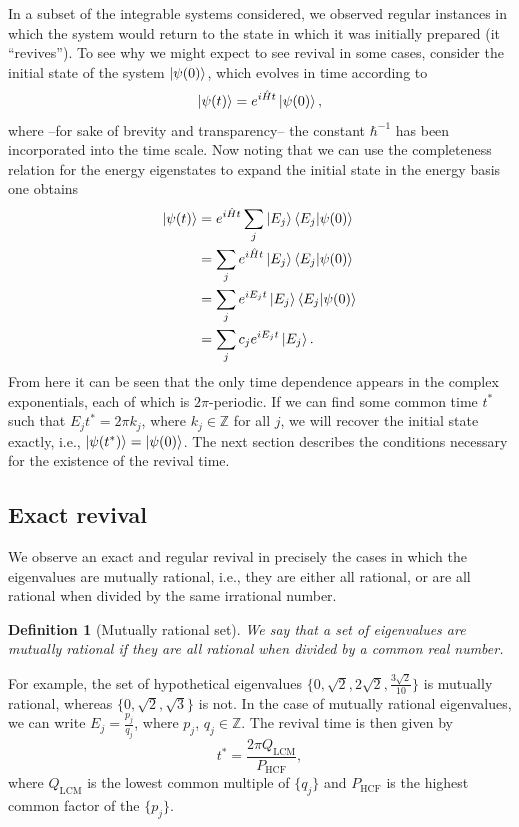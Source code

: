 \documentclass[prb, twocolumn, final]{revtex4-1}
\theoremstyle{plain}
\newtheorem{definition}[]{Definition}
\begin{document}
In a subset of the integrable systems considered, we observed regular instances
in which the system would return to the state in which it was initially
prepared (it ``revives''). To see why we might expect to see revival in
some cases, consider the initial state of the system $\ket{\psi(0)}$, which
evolves in time according to
\begin{equation}
    \ket{\psi(t)} = e^{i \hat{H} t} \ket{\psi(0)},
\end{equation}
where --for sake of brevity and transparency-- the constant $\hbar^{-1}$ has
been incorporated into the time scale. Now noting that we can use the
completeness relation for the energy eigenstates to expand the initial state in
the energy basis one obtains
\begin{align}
\label{time_evolution}
 \ket{\psi(t)} &= e^{i\hat{H}t}\sum_j\ket{E_j}\braket{E_j|\psi(0)}  \nonumber \\
               &= \sum_je^{i\hat{H}t}\ket{E_j}\braket{E_j|\psi(0)}  \nonumber \\
               &= \sum_je^{iE_{j}t}\ket{E_j}\braket{E_j|\psi(0)}    \nonumber \\
               &= \sum_j c_{j}e^{iE_{j}t}\ket{E_j}.
\end{align}
From here it can be seen that the only time dependence appears in the complex
exponentials, each of which is $2 \pi$-periodic. If we can find some common time
$t^{\ast}$ such that $E_{j} t^{\ast} = 2 \pi k_{j}$, where $k_{j} \in\mathbb{Z}$
for all $j$, we will recover the initial state exactly, i.e.,
$\ket{\psi(t^{\ast})} = \ket{\psi(0)}$. The next section describes the
conditions necessary for the existence of the revival time.


\subsection{Exact revival}

We observe an exact and regular revival in precisely the cases in which the
eigenvalues are mutually rational, i.e., they are either all rational, or are
all rational when divided by the same irrational number.
\begin{definition}[Mutually rational set]
    We say that a set of eigenvalues are mutually rational if they are all
    rational when divided by a common real number.
\end{definition}
For example, the set of hypothetical eigenvalues $\lbrace 0, \sqrt{2}, 2
\sqrt{2}, \frac{3 \sqrt{2}}{10} \rbrace$ is mutually rational, whereas $\lbrace
0, \sqrt{2}, \sqrt{3}\rbrace$ is not. In the case of mutually rational
eigenvalues, we can write $E_{j} = \frac{p_{j}}{q_{j}}$, where $p_{j}$, $q_{j}
\in \mathbb{Z}$. The revival time is then given by
\begin{equation}
    \label{revival_time_formula}
    t^{\ast} = \frac{2 \pi Q_{\text{LCM}}}{P_{\text{HCF}}},
\end{equation}
where $Q_{\text{LCM}}$ is the lowest common multiple of $\lbrace q_{j} \rbrace$
and $P_{\text{HCF}}$ is the highest common factor of the $\lbrace p_{j} \rbrace$.
\end{document}
